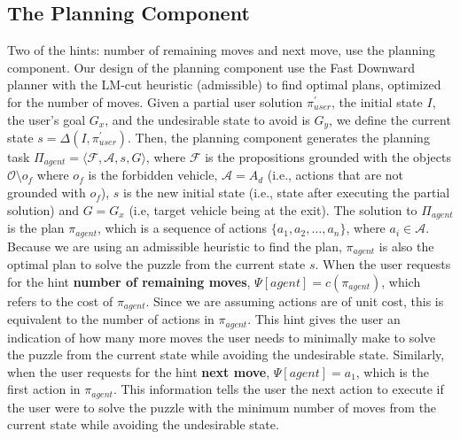 \documentclass[doctor]{thesis} %
\theoremstyle{plain}
\begin{document}
\subsection*{The Planning Component}
Two of the hints: number of remaining moves and next move, use the planning component. Our design of the planning component use the Fast Downward planner \cite{helmert2006} with the LM-cut heuristic (admissible) to find optimal plans, optimized for the number of moves. Given a partial user solution $\pi^\prime _{user}$, the initial state $I$, the user's goal $G_x$, and the undesirable state to avoid is $G_y$, we define the current state $s = \Delta (I,\pi^\prime _{user})$. Then, the planning component generates the planning task $\Pi_{agent} = \langle \mathcal{F}, \mathcal{A}, s, G \rangle$, where $\mathcal{F}$ is the propositions grounded with the objects $\mathcal{O}\setminus o_f$ where $o_f$ is the forbidden vehicle, $\mathcal{A}=A_d$ (i.e., actions that are not grounded with $o_f$), $s$ is the new initial state (i.e., state after executing the partial solution) and $G = G_x$ (i.e, target vehicle being at the exit).
The solution to $\Pi_{agent}$ is the plan $\pi_{agent}$, which is a sequence of actions $\lbrace a_1, a_2, \ldots, a_n\rbrace$, where $a_i \in \mathcal{A}$. Because we are using an admissible heuristic to find the plan, $\pi_{agent}$ is also the optimal plan to solve the puzzle from the current state $s$. When the user requests for the hint \textbf{number of remaining moves}, $\Psi[agent]=c(\pi_{agent})$, which refers to the cost of $\pi_{agent}$. Since we are assuming actions are of unit cost, this is equivalent to the number of actions in $\pi_{agent}$. This hint gives the user an indication of how many more moves the user needs to minimally make to solve the puzzle from the current state while avoiding the undesirable state. Similarly, when the user requests for the hint \textbf{next move}, $\Psi[agent]=a_1$, which is the first action in $\pi_{agent}$. This information tells the user the next action to execute if the user were to solve the puzzle with the minimum number of moves from the current state while avoiding the undesirable state.
\end{document}
